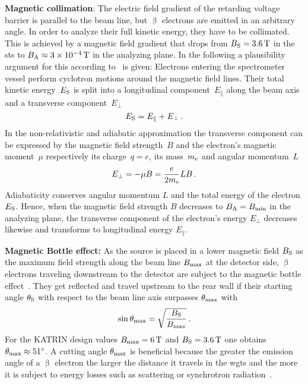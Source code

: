 {\par \textbf{Magnetic collimation}: 
The electric field gradient of the retarding voltage barrier is parallel to the beam line, but $\upbeta$ electrons are emitted in an arbitrary angle. In order to analyze their full kinetic energy, they have to be collimated. This is achieved by a magnetic field gradient that drops from $B_\mathrm{S}=\SI{3.6}{T}$ in the \gls{sts} to $B_\mathrm{A}\approx\SI{3e-4}{T}$ in the analyzing plane. In the following a plausibility argument for this according to~\cite{zuber2011neutrino} is given: Electrons entering the spectrometer vessel perform cyclotron motions around the magnetic field lines. Their total kinetic energy~$E_\mathrm{S}$ is split into a longitudinal component~$E_\parallel$ along the beam axis and a transverse component~$E_\bot$
\begin{equation}
\label{eq:totalKinElecEnergy}
E_\mathrm{S} = E_\parallel + E_\bot \text{\,.}
\end{equation}
In the non-relativistic and adiabatic approximation the transverse component can be expressed by the magnetic field strength~$B$ and the electron's magnetic moment~$\mu$ respectively its charge~$q=e$, its mass~$m_{\mathrm{e}}$ and angular momentum~$L$~\cite{zuber2011neutrino}
\begin{equation}
E_\bot = - \mu B = \frac{e}{2 m_{\mathrm{e}}}LB \text{\,.}
\end{equation}
Adiabaticity conserves angular momentum $L$ and the total energy of the electron $E_\mathrm{S}$. Hence, when the magnetic field strength $B$ decreases to $B_\mathrm{A}=B_\mathrm{min}$ in the analyzing plane, the transverse component of the electron's energy $E_\bot$ decreases likewise and transforms to longitudinal energy $E_\parallel$.}

{\par \textbf{Magnetic Bottle effect:}
As the source is placed in a lower magnetic field $B_\mathrm{S}$ as the maximum field strength along the beam line $B_\mathrm{max}$ at the detector side, $\upbeta$ electrons traveling downstream to the detector are subject to the magnetic bottle effect~\cite{Angrik:2005ep}. They get reflected and travel upstream to the rear wall if their starting angle $\theta_\mathrm{S}$ with respect to the beam line axis surpasses $\theta_\mathrm{max}$ with
\begin{equation}
\label{eq:thetaMax}
\sin\theta_\mathrm{max} = \sqrt{\frac{B_\mathrm{S}}{B_\mathrm{max}}} 
\text{\,.}
\end{equation}
For the KATRIN design values $B_\mathrm{max}=\SI{6}{T}$ and $B_\mathrm{S}=\SI{3.6}{T}$ one obtains $\theta_\mathrm{max}\approx\SI{51}{\degree}$.
A cutting angle $\theta_\mathrm{max}$ is beneficial because the greater the emission angle of a $\upbeta$ electron the larger the distance it travels in the \gls{wgts} and the more it is subject to energy losses such as scattering or synchrotron radiation~\cite{Angrik:2005ep}.}

